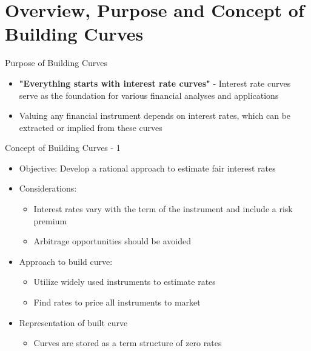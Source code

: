 \documentclass[handout, aspectratio=169]{beamer}
\subtitle{Introduction to Building of Interest Rate Curves}
\begin{document}
 



\section{Overview, Purpose and Concept of Building Curves}
 
\begin{frame}{Purpose of Building Curves}
	\begin{itemize}
		\item \textbf{"Everything starts with interest rate curves"} - Interest rate curves serve as the foundation for various financial analyses and applications
		\item Valuing any financial instrument depends on interest rates, which can be extracted or implied from these curves
	\end{itemize}
\end{frame}

\begin{frame}{Concept of Building Curves - 1}
	\begin{itemize}
		\item Objective: Develop a rational approach to estimate fair interest rates
		\item Considerations:
		\begin{itemize}
			\item Interest rates vary with the term of the instrument and include a risk premium
			\item Arbitrage opportunities should be avoided
		\end{itemize}
		\item Approach to build curve: 
		\begin{itemize}
			\item Utilize widely used instruments to estimate rates
			\item Find rates to price all instruments to market
		\end{itemize}
		\item Representation of built curve
		\begin{itemize}
			\item Curves are stored as a term structure of zero rates
		\end{itemize}
	\end{itemize}
\end{frame}
\end{document}
